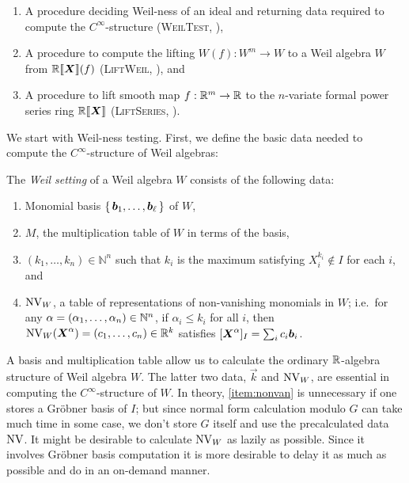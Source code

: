 \begin{enumerate}
  \item A procedure deciding Weil-ness of an ideal and returning data required to compute the $C^\infty$-structure (\textsc{WeilTest}, ),
  \item A procedure to compute the lifting  $W(f): W^m \to W$ to a Weil algebra $W$ from $\mathord{\mathbb{R}\llbracket\boldsymbol{X}\rrbracket}(f)$ (\textsc{LiftWeil}, ), and
  \item A procedure to lift smooth map $f: \mathbb{R}^m \to \mathbb{R}$ to the $n$-variate formal power series ring $\mathord{\mathbb{R}\llbracket\boldsymbol{X}\rrbracket}$ (\textsc{LiftSeries}, ).\label{step:lift-series}
\end{enumerate}

We start with Weil-ness testing.
First, we define the basic data needed to compute the $C^\infty$-structure of Weil algebras:

\begin{definition}
  The \emph{Weil setting} of a Weil algebra $W$ consists of the following data:
  \begin{enumerate}[ref=(\arabic*)]
    \item Monomial basis $\set{\boldsymbol{b}_1, \dots, \boldsymbol{b}_\ell}$ of $W$,
    \item $M$, the multiplication table of $W$ in terms of the basis,
    \item $(k_1, \dots, k_n) \in \mathbb{N}^n$ such that $k_i$ is the maximum satisfying $X_i^{k_i} \notin I$ for each $i$, and
    \item $\operatorname{NV}_W$, a table of representations of non-vanishing monomials in $W$;
    i.e.\ for any $\alpha = (\alpha_1, \dots, \alpha_n) \in \mathbb{N}^n$, if $\alpha_i \leq k_i$ for all $i$, then $\operatorname{NV}_W(\boldsymbol{X}^\alpha) = (c_1, \dots, c_n) \in \mathbb{R}^k$ satisfies $[\boldsymbol{X}^\alpha]_I = \sum_i c_i \boldsymbol{b}_i$.\label{item:nonvan}
  \end{enumerate}
\end{definition}

A basis and multiplication table allow us to calculate the ordinary $\mathbb{R}$-algebra structure of Weil algebra $W$.
The latter two data, $\vec{k}$ and $\operatorname{NV}_W$, are essential in computing the $C^\infty$-structure of $W$.
In theory, \ref{item:nonvan} is unnecessary if one stores a Gr\"{o}bner basis of $I$;
but since normal form calculation modulo $G$ can take much time in some case, we don't store $G$ itself and use the precalculated data $\operatorname{NV}$.
It might be desirable to calculate $\operatorname{NV}_W$ as lazily as possible.
Since it involves Gr\"{o}bner basis computation it is more desirable to delay it as much as possible and do in an on-demand manner.

